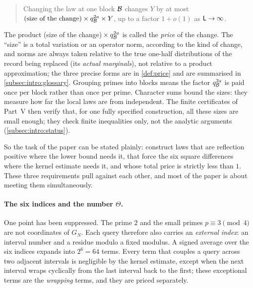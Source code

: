 \begin{quote}
Changing the law at one block $\mathcal B$ changes $Y$ by at most
$(\text{size of the change})\times q_{\mathcal B}^{2a}\times Y$, up to a
factor $1+o(1)$ as $\mathsf L\to\infty$.
\end{quote}

The product (size of the change)${}\times q_{\mathcal B}^{2a}$ is called
the \emph{price} of the change. The ``size'' is a total variation
or an operator norm, according to the kind of change, and norms are
always taken relative to the true one-half distributions of the
record being replaced (its \emph{actual marginals}), not relative
to a product approximation; the three precise forms are in
\cref{def:price} and are summarised in
\cref{subsec:intro:glossary}. Grouping primes into blocks means
the factor $q_{\mathcal B}^{2a}$ is paid once per block rather than once
per prime. Character sums bound the sizes: they measure how far
the local laws are from independent. The finite certificates of
Part~V then verify that, for one fully specified construction, all
these sizes are small enough; they check finite inequalities only,
not the analytic arguments (\cref{subsec:intro:status}).

So the task of the paper can be stated plainly: construct laws
that are reflection positive where the lower bound needs it, that
force the six square differences where the kernel estimate needs
it, and whose total price is strictly less than $1$. These three
requirements pull against each other, and most of the paper is
about meeting them simultaneously.

\paragraph{The six indices and the number $\Theta$.}
One point has been suppressed. The prime $2$ and the small primes
$p\equiv3\pmod4$ are not coordinates of $G_N$. Each query therefore
also carries an \emph{external index}: an interval number and a
residue modulo a fixed modulus. A signed average over the six
indices expands into $2^6=64$ terms. Every term that couples a
query across two adjacent intervals is negligible by the kernel
estimate, except when the next interval wraps cyclically from the
last interval back to the first; these exceptional terms are the
\emph{wrapping} terms, and they are priced separately.

